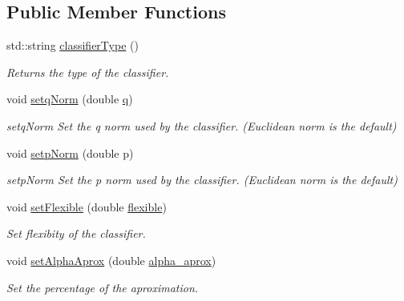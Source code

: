 \subsection*{Public Member Functions}
\begin{DoxyCompactItemize}
\item 
std\+::string \hyperlink{class_primal_classifier_a637fc3cb89994277e902758c7fc3f763}{classifier\+Type} ()
\begin{DoxyCompactList}\small\item\em Returns the type of the classifier. \end{DoxyCompactList}\item 
void \hyperlink{class_primal_classifier_a7e6953c01b190e6ef968b75bd578ad7d}{setq\+Norm} (double \hyperlink{class_primal_classifier_ae30c00c25bce4b1623baa54b5e2812b4}{q})
\begin{DoxyCompactList}\small\item\em setq\+Norm Set the q norm used by the classifier. (Euclidean norm is the default) \end{DoxyCompactList}\item 
void \hyperlink{class_primal_classifier_ad0c3b7577b6c11da7394105dd2002f1d}{setp\+Norm} (double p)
\begin{DoxyCompactList}\small\item\em setp\+Norm Set the p norm used by the classifier. (Euclidean norm is the default) \end{DoxyCompactList}\item 
void \hyperlink{class_primal_classifier_a7e5c459cb4a377c794502cd9831ee095}{set\+Flexible} (double \hyperlink{class_primal_classifier_a5d41554dc1158ede39d387fecf73c96e}{flexible})
\begin{DoxyCompactList}\small\item\em Set flexibity of the classifier. \end{DoxyCompactList}\item 
void \hyperlink{class_primal_classifier_a049f4814d38b456c80c40cee5595502b}{set\+Alpha\+Aprox} (double \hyperlink{class_primal_classifier_a2668546ac4a39e10f72cbd2e865c41a7}{alpha\+\_\+aprox})
\begin{DoxyCompactList}\small\item\em Set the percentage of the aproximation. \end{DoxyCompactList}\end{DoxyCompactItemize}

